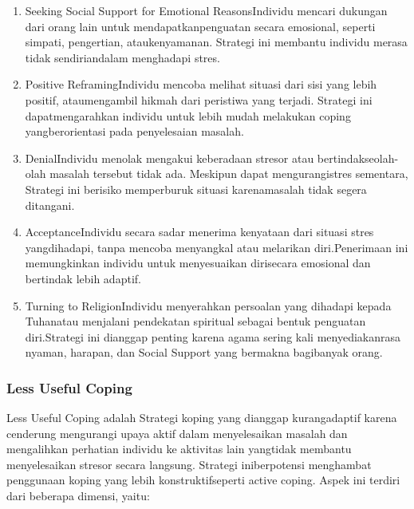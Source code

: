 \documentclass[../manperil.tex]{subfiles}
\begin{document}
\begin{enumerate}
	\item Seeking Social Support for Emotional ReasonsIndividu mencari dukungan dari orang lain untuk mendapatkanpenguatan secara emosional, seperti simpati, pengertian, ataukenyamanan. Strategi ini membantu individu merasa tidak sendiriandalam menghadapi stres.
	\item Positive ReframingIndividu mencoba melihat situasi dari sisi yang lebih positif, ataumengambil hikmah dari peristiwa yang terjadi. Strategi ini dapatmengarahkan individu untuk lebih mudah melakukan coping yangberorientasi pada penyelesaian masalah.
	\item DenialIndividu menolak mengakui keberadaan stresor atau bertindakseolah-olah masalah tersebut tidak ada. Meskipun dapat mengurangistres sementara, Strategi ini berisiko memperburuk situasi karenamasalah tidak segera ditangani.
	\item AcceptanceIndividu secara sadar menerima kenyataan dari situasi stres yangdihadapi, tanpa mencoba menyangkal atau melarikan diri.Penerimaan ini memungkinkan individu untuk menyesuaikan dirisecara emosional dan bertindak lebih adaptif.
	\item Turning to ReligionIndividu menyerahkan persoalan yang dihadapi kepada Tuhanatau menjalani pendekatan spiritual sebagai bentuk penguatan diri.Strategi ini dianggap penting karena agama sering kali menyediakanrasa nyaman, harapan, dan Social Support yang bermakna bagibanyak orang.
\end{enumerate}

\subsubsection{Less Useful Coping}%
\label{ssub:less_useful_coping}
Less Useful Coping adalah Strategi koping yang dianggap kurangadaptif karena cenderung mengurangi upaya aktif dalam menyelesaikan masalah dan mengalihkan perhatian individu ke aktivitas lain yangtidak membantu menyelesaikan stresor secara langsung. Strategi iniberpotensi menghambat penggunaan koping yang lebih konstruktifseperti active coping. Aspek ini terdiri dari beberapa dimensi, yaitu:
\end{document}
